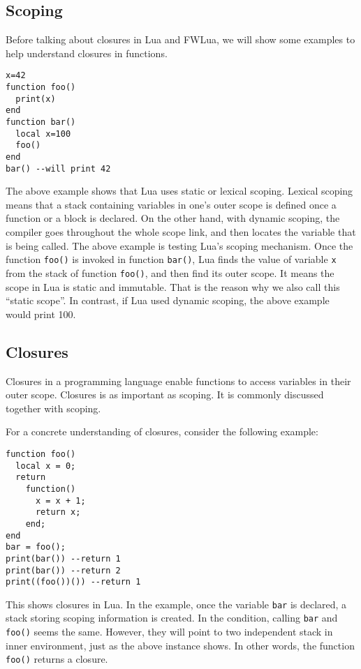 \subsection{Scoping}
Before talking about closures in Lua and FWLua, we will show some examples to help understand closures in functions.

\begin{verbatim}
x=42
function foo()
  print(x)
end
function bar()
  local x=100
  foo()
end
bar() --will print 42
\end{verbatim}

The above example shows that Lua uses static or lexical scoping. Lexical scoping means that a stack containing variables in one's outer scope is defined once a function or a block is declared. On the other hand, with dynamic scoping, the compiler goes throughout the whole scope link, and then locates the variable that is being called. The above example is testing Lua's scoping mechanism. Once the function {\tt foo()} is invoked in function {\tt bar()}, Lua finds the value of variable {\tt x} from the stack of function {\tt foo()}, and then find its outer scope. It means the scope in Lua is static and immutable. That is the reason why we also call this ``static scope''. In contrast, if Lua used dynamic scoping, the above example would print 100.


\subsection{Closures}
Closures in a programming language enable functions to access variables in their outer scope. Closures is as important as scoping. It is commonly discussed together with scoping.

For a concrete understanding of closures, consider the following example:

\begin{verbatim}
function foo()
  local x = 0;
  return 
    function() 
      x = x + 1;
      return x; 
    end;
end
bar = foo();
print(bar()) --return 1
print(bar()) --return 2
print((foo())()) --return 1
\end{verbatim}

This shows closures in Lua.
In the example, once the variable {\tt bar} is declared, a stack storing scoping information is created.
In the condition, calling {\tt bar} and {\tt foo()} seems the same. However, they will point to two independent stack in inner environment, just as the above instance shows. In other words, the function {\tt foo()} returns a closure.

